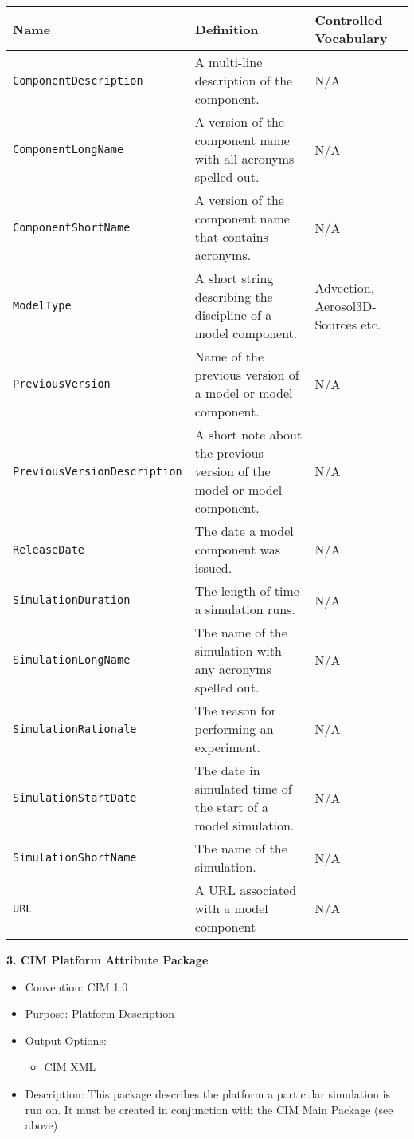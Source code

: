 \begin{tabular}{|p{8cm}|p{20cm}|p{10cm}}
     {\bf Name} & {\bf Definition} & {\bf Controlled Vocabulary}\\
     \hline\hline
     {\tt ComponentDescription} & A multi-line description of the component. & N/A \\
     {\tt ComponentLongName} & A version of the component name with all acronyms spelled out. & N/A\\
     {\tt ComponentShortName} & A version of the component name that contains acronyms. & N/A \\
     {\tt ModelType} & A short string describing the discipline of a model component. & Advection, Aerosol3D-Sources etc.\\
     {\tt PreviousVersion} & Name of the previous version of a model or model component. & N/A\\ 
     {\tt PreviousVersionDescription} &  A short note about the previous version of the model or model component. & N/A \\ 
     {\tt ReleaseDate} & The date a model component was issued. & N/A \\
     {\tt SimulationDuration} & The length of time a simulation runs.&  N/A\\ 
     {\tt SimulationLongName} & The name of the simulation with any acronyms spelled out. & N/A \\ 
     {\tt SimulationRationale} & The reason for performing an experiment. & N/A\\
     {\tt SimulationStartDate} & The date in simulated time of the start of a model simulation. & N/A\\ 
     {\tt SimulationShortName} & The name of the simulation. & N/A \\
     {\tt URL} & A URL associated with a model component & N/A \\
\end{tabular}

\vspace{.20in}


{\bf 3. CIM Platform Attribute Package}

\begin{itemize}
    \item Convention: CIM 1.0
    \item Purpose: Platform Description
    \item Output Options:
    \begin{itemize}
       \item CIM XML 
    \end{itemize} 
    \item Description: This package describes the platform a particular simulation is run on. It must be created in conjunction with the CIM Main Package (see above) 
\end{itemize}


